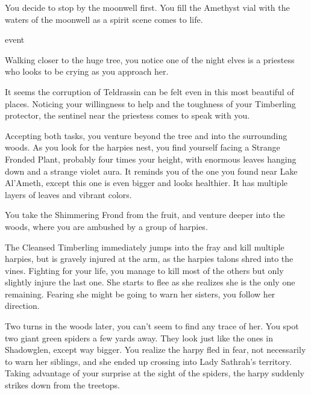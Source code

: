 You decide to stop by the moonwell first. You fill the Amethyst vial with the waters of the moonwell as a spirit scene comes to life.

 event

Walking closer to the huge tree, you notice one of the night elves is a priestess who looks to be crying as you approach her.


It seems the corruption of Teldrassin can be felt even in this most beautiful of places. Noticing your willingness to help and the toughness of your Timberling protector, the sentinel near the priestess comes to speak with you.


Accepting both tasks, you venture beyond the tree and into the surrounding woods. As you look for the harpies nest, you find yourself facing a Strange Fronded Plant, probably four times your height, with enormous leaves hanging down and a strange violet aura. It reminds you of the one you found near Lake Al'Ameth, except this one is even bigger and looks healthier. It has multiple layers of leaves and vibrant colors.


You take the Shimmering Frond from the fruit, and venture deeper into the woods, where you are ambushed by a group of harpies.


The Cleansed Timberling immediately jumps into the fray and kill multiple harpies, but is gravely injured at the arm, as the harpies talons shred into the vines. Fighting for your life, you manage to kill most of the others but only slightly injure the last one. She starts to flee as she realizes she is the only one remaining. Fearing she might be going to warn her sisters, you follow her direction.

Two turns in the woods later, you can't seem to find any trace of her. You spot two giant green spiders a few yards away. They look just like the ones in Shadowglen, except way bigger. You realize the harpy fled in fear, not necessarily to warn her siblings, and she ended up crossing into Lady Sathrah's territory. Taking advantage of your surprise at the sight of the spiders, the harpy suddenly strikes down from the treetops.

